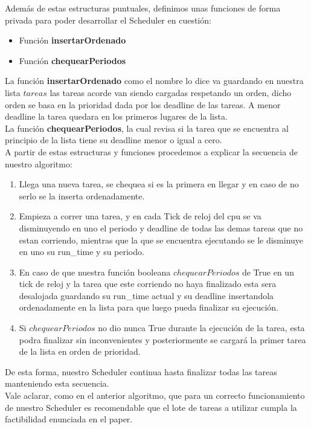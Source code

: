 Además de estas estructuras puntuales, definimos unas funciones de forma privada para poder
desarrollar el Scheduler en cuestión:

\begin{itemize}
 \item Función \textbf{insertarOrdenado}  
 \item Función  \textbf{chequearPeriodos}
  \end{itemize}
  
La función \textbf{insertarOrdenado}  como el nombre lo dice va guardando en nuestra lista $tareas$ las tareas
acorde van siendo cargadas respetando un orden, dicho orden se basa en la prioridad dada por los
deadline de las tareas. A menor deadline la tarea quedara en los primeros lugares de la lista.\\

La función \textbf{chequearPeriodos}, la cual revisa si la tarea que se encuentra al principio de la lista
tiene su deadline menor o igual a cero.\\

A partir de estas estructuras y funciones procedemos a explicar la secuencia de nuestro algoritmo:

\begin{enumerate}
 \item Llega una nueva tarea, se chequea si es la primera en llegar y en caso de no serlo se la inserta ordenadamente.
 \item Empieza a correr una tarea, y en cada Tick de reloj del cpu se va disminuyendo en uno el periodo y deadline
 de todas las demas tareas que no estan corriendo, mientras que la que se encuentra ejecutando
 se le disminuye en uno su run\_time y su periodo.
 \item En caso de que nuestra función booleana $chequearPeriodos$ de True en un tick de reloj
 y la tarea que este corriendo no haya finalizado esta sera desalojada guardando su run\_time actual y su deadline
 insertandola ordenadamente en la lista para que luego pueda finalizar su ejecución.
 \item Si $chequearPeriodos$ no dio nunca True durante la ejecución de la tarea, esta podra finalizar sin
 inconvenientes y posteriormente se cargará la primer tarea de la lista en orden de prioridad.
\end{enumerate}

De esta forma, nuestro Scheduler continua hasta finalizar todas las tareas manteniendo esta secuencia.\\

Vale aclarar, como en el anterior algoritmo, que para un correcto funcionamiento de nuestro
Scheduler es recomendable que el lote de tareas a utilizar cumpla la factibilidad enunciada
en el paper.\\
